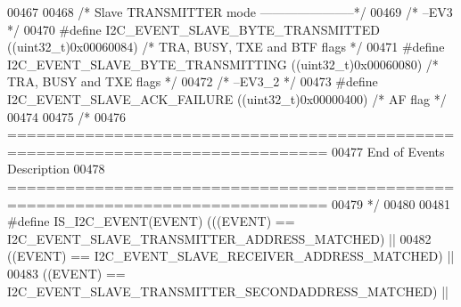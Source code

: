 \begin{DoxyCode}
00467 
00468 \textcolor{comment}{/* Slave TRANSMITTER mode -----------------------*/}
00469 \textcolor{comment}{/* --EV3 */}
00470 \textcolor{preprocessor}{#}\textcolor{preprocessor}{define}  \textcolor{preprocessor}{I2C\_EVENT\_SLAVE\_BYTE\_TRANSMITTED}                  \textcolor{preprocessor}{(}\textcolor{preprocessor}{(}\textcolor{preprocessor}{uint32\_t}\textcolor{preprocessor}{)}0x00060084\textcolor{preprocessor}{)}  \textcolor{comment}{/* TRA, BUSY, TXE
       and BTF flags */}
00471 \textcolor{preprocessor}{#}\textcolor{preprocessor}{define}  \textcolor{preprocessor}{I2C\_EVENT\_SLAVE\_BYTE\_TRANSMITTING}                 \textcolor{preprocessor}{(}\textcolor{preprocessor}{(}\textcolor{preprocessor}{uint32\_t}\textcolor{preprocessor}{)}0x00060080\textcolor{preprocessor}{)}  \textcolor{comment}{/* TRA, BUSY and
       TXE flags */}
00472 \textcolor{comment}{/* --EV3\_2 */}
00473 \textcolor{preprocessor}{#}\textcolor{preprocessor}{define}  \textcolor{preprocessor}{I2C\_EVENT\_SLAVE\_ACK\_FAILURE}                       \textcolor{preprocessor}{(}\textcolor{preprocessor}{(}\textcolor{preprocessor}{uint32\_t}\textcolor{preprocessor}{)}0x00000400\textcolor{preprocessor}{)}  \textcolor{comment}{/* AF flag */}
00474 
00475 \textcolor{comment}{/*}
00476 \textcolor{comment}{ ===============================================================================}
00477 \textcolor{comment}{                          End of Events Description}
00478 \textcolor{comment}{ ===============================================================================}
00479 \textcolor{comment}{ */}
00480 
00481 \textcolor{preprocessor}{#}\textcolor{preprocessor}{define} \textcolor{preprocessor}{IS\_I2C\_EVENT}\textcolor{preprocessor}{(}\textcolor{preprocessor}{EVENT}\textcolor{preprocessor}{)} \textcolor{preprocessor}{(}\textcolor{preprocessor}{(}\textcolor{preprocessor}{(}\textcolor{preprocessor}{EVENT}\textcolor{preprocessor}{)} \textcolor{preprocessor}{==} 
      I2C_EVENT_SLAVE_TRANSMITTER_ADDRESS_MATCHED\textcolor{preprocessor}{)} \textcolor{preprocessor}{||}
00482                              \textcolor{preprocessor}{(}\textcolor{preprocessor}{(}\textcolor{preprocessor}{EVENT}\textcolor{preprocessor}{)} \textcolor{preprocessor}{==} 
      I2C_EVENT_SLAVE_RECEIVER_ADDRESS_MATCHED\textcolor{preprocessor}{)} \textcolor{preprocessor}{||}
00483                              \textcolor{preprocessor}{(}\textcolor{preprocessor}{(}\textcolor{preprocessor}{EVENT}\textcolor{preprocessor}{)} \textcolor{preprocessor}{==} 
      I2C_EVENT_SLAVE_TRANSMITTER_SECONDADDRESS_MATCHED\textcolor{preprocessor}{)} \textcolor{preprocessor}{||}

\end{DoxyCode}
